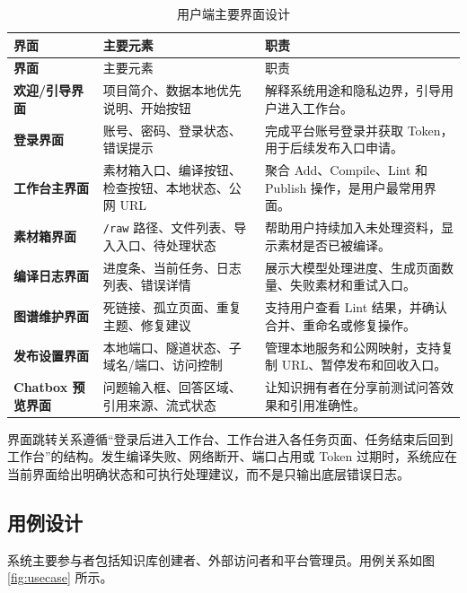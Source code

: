 \documentclass[UTF8,a4paper,12pt,fontset=fandol]{ctexart}
\newcommand{\code}[1]{\texttt{\footnotesize #1}}
\begin{document}
\begin{longtable}{>{\bfseries}p{3.2cm}p{5.1cm}p{5.7cm}}
\caption{用户端主要界面设计}\label{tab:ui}\\
\toprule
界面 & 主要元素 & 职责 \\
\midrule
\endfirsthead
\toprule
界面 & 主要元素 & 职责 \\
\midrule
\endhead
欢迎/引导界面 & 项目简介、数据本地优先说明、开始按钮 & 解释系统用途和隐私边界，引导用户进入工作台。 \\
登录界面 & 账号、密码、登录状态、错误提示 & 完成平台账号登录并获取 Token，用于后续发布入口申请。 \\
工作台主界面 & 素材箱入口、编译按钮、检查按钮、本地状态、公网 URL & 聚合 Add、Compile、Lint 和 Publish 操作，是用户最常用界面。 \\
素材箱界面 & \code{/raw} 路径、文件列表、导入入口、待处理状态 & 帮助用户持续加入未处理资料，显示素材是否已被编译。 \\
编译日志界面 & 进度条、当前任务、日志列表、错误详情 & 展示大模型处理进度、生成页面数量、失败素材和重试入口。 \\
图谱维护界面 & 死链接、孤立页面、重复主题、修复建议 & 支持用户查看 Lint 结果，并确认合并、重命名或修复操作。 \\
发布设置界面 & 本地端口、隧道状态、子域名/端口、访问控制 & 管理本地服务和公网映射，支持复制 URL、暂停发布和回收入口。 \\
Chatbox 预览界面 & 问题输入框、回答区域、引用来源、流式状态 & 让知识拥有者在分享前测试问答效果和引用准确性。 \\
\bottomrule
\end{longtable}

界面跳转关系遵循“登录后进入工作台、工作台进入各任务页面、任务结束后回到工作台”的结构。发生编译失败、网络断开、端口占用或 Token 过期时，系统应在当前界面给出明确状态和可执行处理建议，而不是只输出底层错误日志。

\subsection{用例设计}
系统主要参与者包括知识库创建者、外部访问者和平台管理员。用例关系如图 \ref{fig:usecase} 所示。
\end{document}
